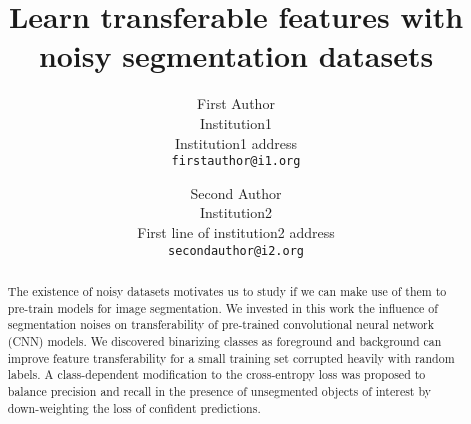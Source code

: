 \documentclass[10pt,twocolumn,letterpaper]{article}
\begin{document}
\onecolumn
{}


\twocolumn
{}
\newpage
\title{Learn transferable features with noisy segmentation datasets}

\author{First Author\\
Institution1\\
Institution1 address\\
{\tt\small firstauthor@i1.org}
\and
Second Author\\
Institution2\\
First line of institution2 address\\
{\tt\small secondauthor@i2.org}
}

\maketitle


\begin{abstract}

The existence of noisy datasets motivates us to study if we can make use of them to pre-train models for image segmentation.
We invested in this work the influence of segmentation noises on transferability of pre-trained convolutional neural network (CNN) models.
We discovered binarizing classes as foreground and background can improve feature transferability for a small training set corrupted heavily with random labels.
A class-dependent modification to the cross-entropy loss was proposed to balance precision and recall in the presence of unsegmented objects of interest by down-weighting the loss of confident predictions.

\end{abstract}

















{\small


}

\clearpage

\end{document}
